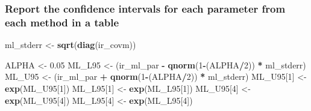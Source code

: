 \documentclass[
]{article}
\newenvironment{Shaded}{\begin{snugshade}}{\end{snugshade}}
\newcommand{\DecValTok}[1]{\textcolor[rgb]{0.00,0.00,0.81}{#1}}
\newcommand{\FloatTok}[1]{\textcolor[rgb]{0.00,0.00,0.81}{#1}}
\newcommand{\KeywordTok}[1]{\textcolor[rgb]{0.13,0.29,0.53}{\textbf{#1}}}
\newcommand{\NormalTok}[1]{#1}
\newcommand{\OperatorTok}[1]{\textcolor[rgb]{0.81,0.36,0.00}{\textbf{#1}}}
\newcommand{\StringTok}[1]{\textcolor[rgb]{0.31,0.60,0.02}{#1}}
\begin{document}
\hypertarget{report-the-confidence-intervals-for-each-parameter-from-each-method-in-a-table-1}{%
\subsubsection{Report the confidence intervals for each parameter from
each method in a
table}\label{report-the-confidence-intervals-for-each-parameter-from-each-method-in-a-table-1}}

\begin{Shaded}
\begin{Highlighting}[]
\NormalTok{ml\_stderr \textless{}{-}}\StringTok{ }\KeywordTok{sqrt}\NormalTok{(}\KeywordTok{diag}\NormalTok{(ir\_covm))}

\NormalTok{ALPHA \textless{}{-}}\StringTok{ }\FloatTok{0.05}
\NormalTok{ML\_L95 \textless{}{-}}\StringTok{ }\NormalTok{(ir\_ml\_par }\OperatorTok{{-}}\StringTok{ }\KeywordTok{qnorm}\NormalTok{(}\DecValTok{1}\OperatorTok{{-}}\NormalTok{(ALPHA}\OperatorTok{/}\DecValTok{2}\NormalTok{)) }\OperatorTok{*}\StringTok{ }\NormalTok{ml\_stderr)}
\NormalTok{ML\_U95 \textless{}{-}}\StringTok{ }\NormalTok{(ir\_ml\_par }\OperatorTok{+}\StringTok{ }\KeywordTok{qnorm}\NormalTok{(}\DecValTok{1}\OperatorTok{{-}}\NormalTok{(ALPHA}\OperatorTok{/}\DecValTok{2}\NormalTok{)) }\OperatorTok{*}\StringTok{ }\NormalTok{ml\_stderr)}
\NormalTok{ML\_U95[}\DecValTok{1}\NormalTok{] \textless{}{-}}\StringTok{ }\KeywordTok{exp}\NormalTok{(ML\_U95[}\DecValTok{1}\NormalTok{])}
\NormalTok{ML\_L95[}\DecValTok{1}\NormalTok{] \textless{}{-}}\StringTok{ }\KeywordTok{exp}\NormalTok{(ML\_L95[}\DecValTok{1}\NormalTok{])}
\NormalTok{ML\_U95[}\DecValTok{4}\NormalTok{] \textless{}{-}}\StringTok{ }\KeywordTok{exp}\NormalTok{(ML\_U95[}\DecValTok{4}\NormalTok{])}
\NormalTok{ML\_L95[}\DecValTok{4}\NormalTok{] \textless{}{-}}\StringTok{ }\KeywordTok{exp}\NormalTok{(ML\_L95[}\DecValTok{4}\NormalTok{])}
\end{Highlighting}
\end{Shaded}

\begin{Shaded}
\end{Shaded}
\end{document}
